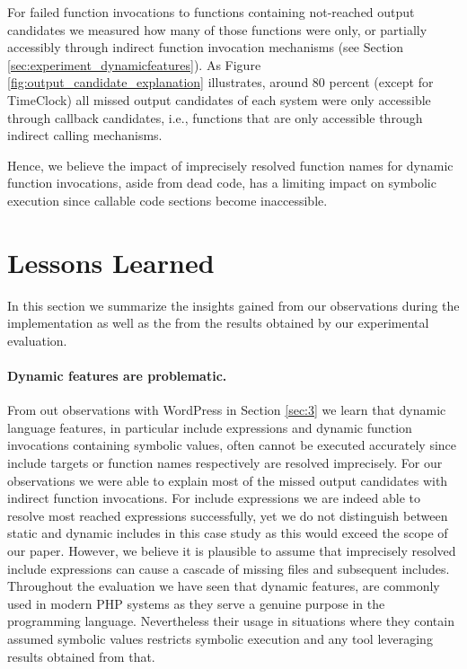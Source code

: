 \documentclass[sigconf]{acmart}
\renewcommand{\sf}[1]{\textsf{#1}}
\begin{document}
For failed function invocations to functions containing not-reached output
candidates we measured how many of those functions were only, or
partially accessibly through indirect function invocation mechanisms (see
Section \ref{sec:experiment_dynamicfeatures}). As Figure
\ref{fig:output_candidate_explanation} illustrates, around 80 percent (except
for \sf{TimeClock}) all missed output candidates of each system were only
accessible through callback candidates, i.e., functions that are only
accessible through indirect calling mechanisms.

Hence, we believe the impact of imprecisely resolved function names for dynamic
function invocations, aside from dead code, has a limiting impact on symbolic
execution since callable code sections become inaccessible.

\section{Lessons Learned}
In this section we summarize the insights gained from our observations during
the implementation as well as the from the results obtained by our experimental
evaluation.

\paragraph{Dynamic features are problematic.}
From out observations with \sf{WordPress} in Section \ref{sec:3} we learn that
dynamic language features, in particular include expressions and dynamic
function invocations containing symbolic values, often cannot be executed
accurately since include targets or function names respectively are resolved
imprecisely.
For our observations we were able to explain most of the missed
output candidates with indirect function invocations. For include expressions we
are indeed able to resolve most reached expressions successfully, yet we do not
distinguish between static and dynamic includes in this case study as this 
would exceed the scope of our paper. However, we believe it is plausible to
assume that imprecisely resolved include expressions can cause a cascade of
missing files and subsequent includes.
Throughout the evaluation we have seen that dynamic features, are commonly used
in modern PHP systems as they serve a genuine purpose in the programming
language.
Nevertheless their usage in situations where they contain assumed symbolic
values restricts symbolic execution and any tool leveraging results obtained
from that.
\end{document}
